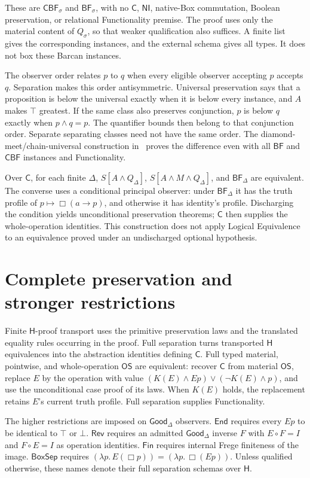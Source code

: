 \documentclass[12pt,letterpaper]{article}
\newcommand{\Hlogic}{\mathsf{H}}
\newcommand{\C}{\mathsf{C}}
\newcommand{\BF}{\mathsf{BF}}
\newcommand{\CBF}{\mathsf{CBF}}
\newcommand{\OS}{\mathsf{OS}}
\newcommand{\Good}{\mathsf{Good}}
\newcommand{\End}{\mathsf{End}}
\newcommand{\Rev}{\mathsf{Rev}}
\newcommand{\Fin}{\mathsf{Fin}}
\newcommand{\BoxSep}{\mathsf{BoxSep}}
\newcommand{\NI}{\mathsf{NI}}
\begin{document}
These are $\CBF_\sigma$ and $\BF_\sigma$, with no $\C$, $\NI$, native-Box commutation, Boolean preservation, or relational Functionality premise. The proof uses only the material content of $Q_\sigma$, so that weaker qualification also suffices. A finite list gives the corresponding instances, and the external schema gives all types. It does not box these Barcan instances.~\cite[\S3]{r3}


The observer order relates $p$ to $q$ when every eligible observer accepting $p$ accepts $q$. Separation makes this order antisymmetric. Universal preservation says that a proposition is below the universal exactly when it is below every instance, and $A$ makes $\top$ greatest. If the same class also preserves conjunction, $p$ is below $q$ exactly when $p\land q=p$. The quantifier bounds then belong to that conjunction order. Separate separating classes need not have the same order. The diamond-meet/chain-universal construction in~\cite[\S5]{r3} proves the difference even with all $\BF$ and $\CBF$ instances and Functionality.


Over $\C$, for each finite $\Delta$, $S[A\land Q_\Delta]$, $S[A\land M\land Q_\Delta]$, and $\BF_\Delta$ are equivalent. The converse uses a conditional principal observer: under $\BF_\Delta$ it has the truth profile of $p\mapsto\Box(a\to p)$, and otherwise it has identity's profile. Discharging the condition yields unconditional preservation theorems; $\C$ then supplies the whole-operation identities. This construction does not apply Logical Equivalence to an equivalence proved under an undischarged optional hypothesis.~\cite[\S4]{r3}


\section{Complete preservation and stronger restrictions}

Finite $\Hlogic$-proof transport uses the primitive preservation laws and the translated equality rules occurring in the proof. Full separation turns transported $\Hlogic$ equivalences into the abstraction identities defining $\C$. Full typed material, pointwise, and whole-operation $\OS$ are equivalent: recover $\C$ from material $\OS$, replace $E$ by the operation with value $(K(E)\land Ep)\lor(\neg K(E)\land p)$, and use the unconditional case proof of its laws. When $K(E)$ holds, the replacement retains $E$'s current truth profile. Full separation supplies Functionality.~\cite[\S\S2--4]{r6}


The higher restrictions are imposed on $\Good_\Delta$ observers. $\End$ requires every $Ep$ to be identical to $\top$ or $\bot$. $\Rev$ requires an admitted $\Good_\Delta$ inverse $F$ with $E\circ F=I$ and $F\circ E=I$ as operation identities. $\Fin$ requires internal Frege finiteness of the image. $\BoxSep$ requires $(\lambda p.\,E(\Box p))=(\lambda p.\,\Box(Ep))$. Unless qualified otherwise, these names denote their full separation schemas over $\Hlogic$.
\end{document}

